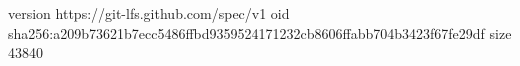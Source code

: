 version https://git-lfs.github.com/spec/v1
oid sha256:a209b73621b7ecc5486ffbd9359524171232cb8606ffabb704b3423f67fe29df
size 43840
